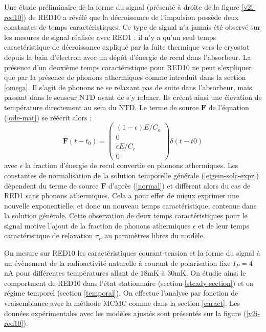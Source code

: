 Une étude préliminaire de la forme du signal (présenté à droite de la figure \ref{v2i-red10}) de RED10 a révélé que la décroissance de l'impulsion possède deux constantes de temps caractéristiques. Ce type de signal n'a jamais été observé sur les mesures de signal réalisée avec RED1 : il n'y a qu'un seul temps caractéristique de décroissance expliqué par la fuite thermique vers le cryostat depuis la bain d'électron avec un dépôt d'énergie de recul dans l'absorbeur. La présence d'un deuxième temps caractéristique pour RED10 ne peut s'expliquer que par la présence de phonons athermiques comme introduit dans la section \ref{omega}. Il s'agit de phonons ne se relaxant pas de suite dans l'absorbeur, mais passant dans le senseur NTD avant de s'y relaxer. Ils créent ainsi une élevation de température directement au sein du NTD. Le terme de source $\bm{F}$ de l'équation (\ref{ode-mat}) se réécrit alors :
\begin{equation}
\bm{F}(t-t_0) = 
\left( \begin{array}{c}
(1-\epsilon)E/C_a \\
0 \\
\epsilon E/C_e \\
0
\end{array} \right) \delta (t-t0)
\end{equation}
avec $\epsilon$ la fraction d'énergie de recul convertie en phonons athermiques. Les constantes de normalisation de la solution temporelle générale (\ref{eigein-solc-expr}) dépendent du terme de source $\bm{F}$ d'après (\ref{normal}) et diffèrent alors du cas de RED1 sans phonons athermiques. Cela a pour effet de mieux exprimer une nouvelle exponentielle, et donc un nouveau temps caractéristique, contenue dans la solution générale. Cette observation de deux temps caractéristiques pour le signal motive l'ajout de la fraction de phonons athermiques $\epsilon$ et de leur temps caractéristique de relaxation $\tau_P$ au paramètres libres du modèle.

On mesure sur RED10 les caractéristiques courant-tension et la forme du signal à un évènement de la radioactivité naturelle à courant de polarisation fixe $I_P=4$nA pour différentes températures allant de $18$mK à $30$mK. On étudie ainsi le comportment de RED10 dans l'état stationnaire (section \ref{steady-section}) et en régime temporel (section \ref{temporal}).
On effectue l'analyse par fonction de vraisemblance avec la méthode MCMC comme dans la section \ref{caract}. Les données expérimentales avec les modèles ajustés sont présentés sur la figure (\ref{v2i-red10}).

